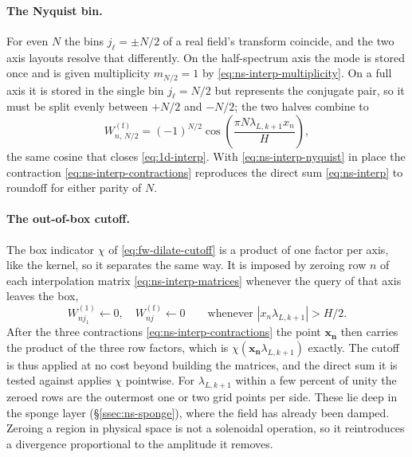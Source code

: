 \documentclass{article}
\begin{document}
\paragraph{The Nyquist bin.}
For even $N$ the bins $j_\ell = \pm N/2$ of a real field's transform coincide,
and the two axis layouts resolve that differently. On the half-spectrum axis
the mode is stored once and is given multiplicity $m_{N/2} = 1$ by
\eqref{eq:ns-interp-multiplicity}. On a full axis it is stored in the single
bin $j_\ell = N/2$ but represents the conjugate pair, so it must be split evenly
between $+N/2$ and $-N/2$; the two halves combine to
\begin{equation}\label{eq:ns-interp-nyquist}
  W^{(\mathrm{f})}_{n,\, N/2} = (-1)^{N/2}
    \cos\!\left( \frac{\pi N \lambda_{L,k+1} x_n}{H} \right),
\end{equation}
the same cosine that closes \eqref{eq:1d-interp}. With
\eqref{eq:ns-interp-nyquist} in place the contraction
\eqref{eq:ns-interp-contractions} reproduces the direct sum
\eqref{eq:ns-interp} to roundoff for either parity of $N$.

\paragraph{The out-of-box cutoff.}
The box indicator $\chi$ of \eqref{eq:fw-dilate-cutoff} is a product of one
factor per axis, like the kernel, so it separates the same way. It is imposed by
zeroing row $n$ of each interpolation matrix \eqref{eq:ns-interp-matrices}
whenever the query of that axis leaves the box,
\begin{equation}\label{eq:ns-interp-cutoff}
  W^{(1)}_{n j_1} \gets 0, \quad W^{(\mathrm{f})}_{n j} \gets 0
  \qquad \text{whenever } |x_n \lambda_{L,k+1}| > H/2 .
\end{equation}
After the three contractions \eqref{eq:ns-interp-contractions} the point
$\mathbf{x_n}$ then carries the product of the three row factors, which is
$\chi(\mathbf{x_n}\lambda_{L,k+1})$ exactly. The cutoff is thus applied at no
cost beyond building the matrices, and the direct sum it is tested against
applies $\chi$ pointwise. For $\lambda_{L,k+1}$ within a few percent of unity
the zeroed rows are the outermost one or two grid points per side. These lie
deep in the sponge layer (\S\ref{ssec:ns-sponge}), where the field has already
been damped. Zeroing a region in physical space is not a
solenoidal operation, so it reintroduces a divergence
proportional to the amplitude it removes.
\end{document}
